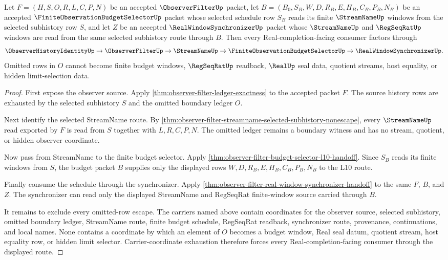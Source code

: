 \begin{theorem}
\label{thm:observer-filter-real-window-budget-exhaustion}
Let $F=(H,S,O,R,L,C,P,N)$ be an accepted $\ObserverFilterUp$ packet, let $B=(B_0,S_B,W,D,R_B,E,H_B,C_B,P_B,N_B)$ be an accepted $\FiniteObservationBudgetSelectorUp$ packet whose selected schedule row $S_B$ reads its finite $\StreamNameUp$ windows from the selected subhistory row $S$, and let $Z$ be an accepted $\RealWindowSynchronizerUp$ packet whose $\StreamNameUp$ and $\RegSeqRatUp$ windows are read from the same selected subhistory route through $B$. Then every Real-completion-facing consumer factors through
$$
\ObserverHistoryIdentityUp \to \ObserverFilterUp \to \StreamNameUp \to \FiniteObservationBudgetSelectorUp \to \RealWindowSynchronizerUp.
$$
Omitted rows in $O$ cannot become finite budget windows, $\RegSeqRatUp$ readback, $\RealUp$ seal data, quotient streams, host equality, or hidden limit-selection data.
\end{theorem}
\begin{proof}
First expose the observer source. Apply \autoref{thm:observer-filter-ledger-exactness} to the accepted packet $F$. The source history rows are exhausted by the selected subhistory $S$ and the omitted boundary ledger $O$.

Next identify the selected StreamName route. By \autoref{thm:observer-filter-streamname-selected-subhistory-nonescape}, every $\StreamNameUp$ read exported by $F$ is read from $S$ together with $L,R,C,P,N$. The omitted ledger remains a boundary witness and has no stream, quotient, or hidden observer coordinate.

Now pass from StreamName to the finite budget selector. Apply \autoref{thm:observer-filter-budget-selector-l10-handoff}. Since $S_B$ reads its finite windows from $S$, the budget packet $B$ supplies only the displayed rows $W,D,R_B,E,H_B,C_B,P_B,N_B$ to the L10 route.

Finally consume the schedule through the synchronizer. Apply \autoref{thm:observer-filter-real-window-synchronizer-handoff} to the same $F$, $B$, and $Z$. The synchronizer can read only the displayed StreamName and RegSeqRat finite-window source carried through $B$.

It remains to exclude every omitted-row escape. The carriers named above contain coordinates for the observer source, selected subhistory, omitted boundary ledger, StreamName route, finite budget schedule, RegSeqRat readback, synchronizer route, provenance, continuations, and local names. None contains a coordinate by which an element of $O$ becomes a budget window, Real seal datum, quotient stream, host equality row, or hidden limit selector. Carrier-coordinate exhaustion therefore forces every Real-completion-facing consumer through the displayed route.
\end{proof}

